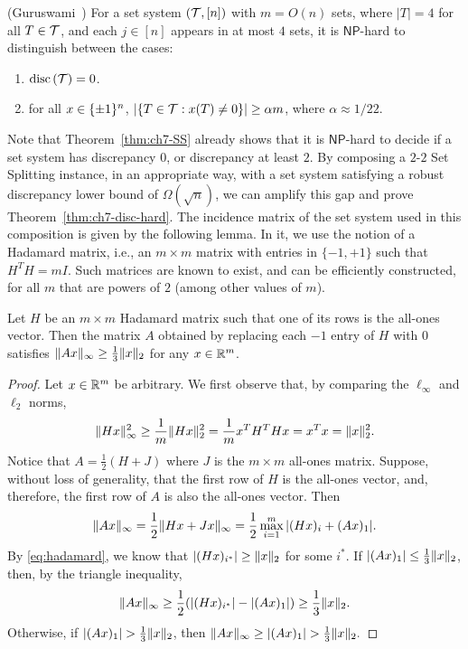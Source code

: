 \begin{theorem}\label{thm:ch7-SS}(Guruswami~\cite{venkat-SS})
For a set system $(\mathcal{T}, [n])$ with $m = O(n)$ sets, where $|T| = 4$
for all $T \in \mathcal{T}$, and each $j \in [n]$ appears in at most $4$
sets, it is $\mathsf{NP}$-hard to distinguish between the cases:
\begin{enumerate}
\item $\operatorname{disc}{(\mathcal{T})} = 0$.
\item for all $x \in \{\pm 1\}^n$, $|\{T \in \mathcal{T}: x(T) \not=
  0 \}| \geq \alpha m$, where $\alpha \approx 1/22$. %
\end{enumerate}
\end{theorem}

Note that Theorem~\ref{thm:ch7-SS} already shows that it is
$\mathsf{NP}$-hard to decide if a set system has discrepancy $0$, or
discrepancy at least $2$. By composing a $2$-$2$ Set Splitting
instance, in an appropriate way, with a set system satisfying a robust
discrepancy lower bound of $\Omega(\sqrt{n})$, we can amplify this gap and prove Theorem~\ref{thm:ch7-disc-hard}. The incidence matrix
of the set system used in this composition is given by the following lemma. In it, we
use the notion of a Hadamard matrix, i.e., an $m \times m$ matrix with
entries in $\{-1,+1\}$ such that $H^T H = mI$. Such matrices are known
to exist, and can be efficiently constructed, for all $m$ that are
powers of $2$ (among other values of $m$). 

\begin{lemma}\label{lm:ch7-hadamard}
  Let $H$ be an $m\times m$ Hadamard matrix such that
  one of its rows is the all-ones vector. Then the matrix
  $A$ obtained by replacing each $-1$ entry of
  $H$  with $0$ satisfies
  \(
  \|Ax\|_\infty \ge \frac{1}{3}\|x\|_2
  \)
  for  any $x \in \mathbb{R}^m$.
\end{lemma}
\begin{proof}
  Let $x \in \mathbb{R}^m$ be arbitrary. We first observe that, by
  comparing the $\ell_\infty$ and $\ell_2$ norms, 
  \begin{align}
  \label{eq:hadamard}
    \| Hx \|_{\infty}^2
    \geq \frac{1}{m} \|Hx \|_2^2
    = \frac1m x^T  H^T H x
    = x^T x =\|x \|_2^2.
  \end{align}
  Notice that $A = \frac12 (H + J)$ where $J$ is the $m\times m$
  all-ones matrix. Suppose, without loss of generality, that the first
  row of $H$ is the all-ones vector, and, therefore, the first row of
  $A$ is also the all-ones vector. Then
  \[
    \|Ax\|_\infty = \frac12 \|Hx + Jx\|_\infty
    = \frac12 \max_{i = 1}^m |(Hx)_i + (Ax)_1|.
  \]
  By \eqref{eq:hadamard}, we know that $|(Hx)_{i^*}|
  \ge \|x\|_2$ for some $i^*$. If $|(Ax)_1| \le \frac13\|x\|_2$, then, by the
  triangle inequality,
  \[
    \|A\col\|_\infty %
    \ge \frac12 (|(H\col)_{i^*}| - |(A\col)_1|) \ge  \frac13 \|\col\|_2.
  \]
  Otherwise, if $|(Ax)_1| > \frac13\|x\|_2$, then 
  \(
  \|Ax\|_\infty  \ge |(Ax)_1| > \frac13\|x\|_2.
  \)
\end{proof}

